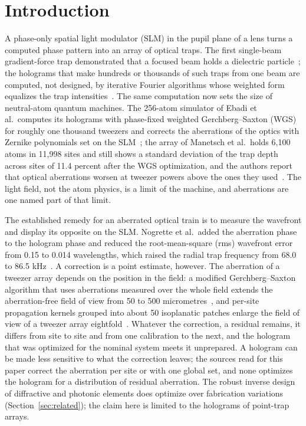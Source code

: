\section{Introduction}\label{sec:intro}

A phase-only spatial light modulator (SLM) in the pupil plane of a lens turns a computed phase pattern into an array of optical traps. The first single-beam gradient-force trap
demonstrated that a focused beam holds a dielectric particle~\cite{ashkin1986}; the holograms that make hundreds or thousands of such traps from one beam are computed, not designed, by
iterative Fourier algorithms whose weighted form equalizes the trap intensities~\cite{dileonardo2007}. The same computation now sets the size of neutral-atom quantum machines. The
256-atom simulator of Ebadi et al.\ computes its holograms with phase-fixed weighted Gerchberg--Saxton (WGS) for roughly one thousand tweezers and corrects the aberrations of the optics with
Zernike polynomials set on the SLM~\cite{ebadi2021}; the array of Manetsch et al.\ holds 6,100 atoms in 11,998 sites and still shows a standard deviation of the trap depth across sites of 11.4
percent after the WGS optimization, and the authors report that optical aberrations worsen at tweezer powers above the ones they used~\cite{manetsch2025}. The light field, not the
atom physics, is a limit of the machine, and aberrations are one named part of that limit.

The established remedy for an aberrated optical train is to measure the wavefront and display its opposite on the SLM. Nogrette et al.\ added the aberration phase to the hologram phase and
reduced the root-mean-square (rms) wavefront error from 0.15 to 0.014 wavelengths, which raised the radial trap frequency from 68.0 to 86.5 kHz~\cite{nogrette2014}. A correction is a point estimate,
however. The aberration of a tweezer array depends on the position in the field: a modified Gerchberg--Saxton algorithm that uses aberrations measured over the whole field extends the aberration-free
field of view from 50 to 500 micrometres~\cite{machu2025}, and per-site propagation kernels grouped into about 50 isoplanatic patches enlarge the field of view of a tweezer array eightfold~\cite{christen2025}.
Whatever the correction, a residual remains, it differs from site to site and from one calibration to the next, and the hologram that was optimized for the nominal system meets it unprepared. A hologram
can be made less sensitive to what the correction leaves; the sources read for this paper correct the aberration per site or with one global set, and none optimizes the hologram for a distribution of residual
aberration. The robust inverse design of diffractive and photonic elements does optimize over fabrication variations (Section~\ref{sec:related}); the claim here is limited to the holograms of point-trap arrays.

